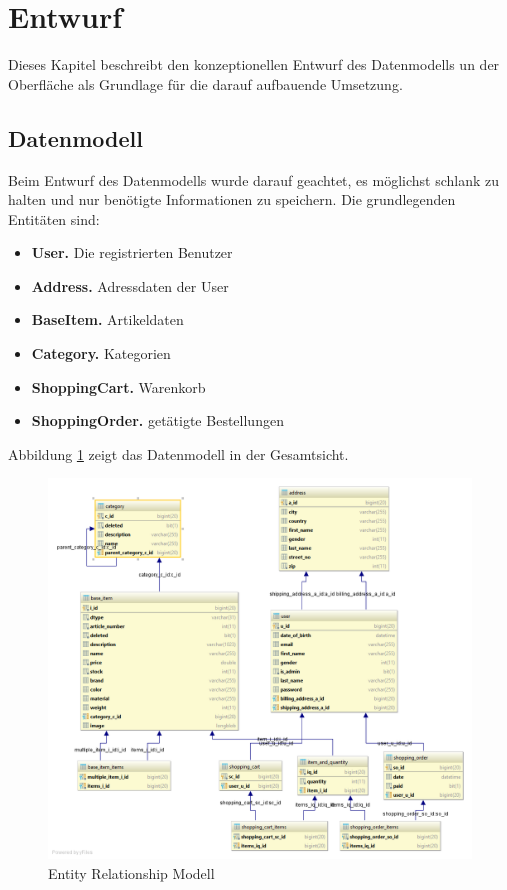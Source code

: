 \section{Entwurf}\label{outline} \thispagestyle{nomarkstyle}
Dieses Kapitel beschreibt den konzeptionellen Entwurf des Datenmodells un der Oberfläche als Grundlage für die darauf aufbauende Umsetzung.

\subsection{Datenmodell}\label{outline_datamodel}
Beim Entwurf des Datenmodells wurde darauf geachtet, es möglichst schlank zu halten und nur benötigte Informationen zu speichern.
Die grundlegenden Entitäten sind:
\begin{itemize}
\item\textbf{User.} Die registrierten Benutzer
\item\textbf{Address.} Adressdaten der User
\item\textbf{BaseItem.} Artikeldaten
\item\textbf{Category.} Kategorien
\item\textbf{ShoppingCart.} Warenkorb
\item\textbf{ShoppingOrder.} getätigte Bestellungen
\end{itemize}


Abbildung \ref{fig:ERM} zeigt das Datenmodell in der Gesamtsicht.
\begin{figure}[th!]
	\centering
	\includegraphics[width=\linewidth]{bilder/kap6/erm_diagram.png}
	\caption{Entity Relationship Modell}
	\label{fig:ERM}
\end{figure}

